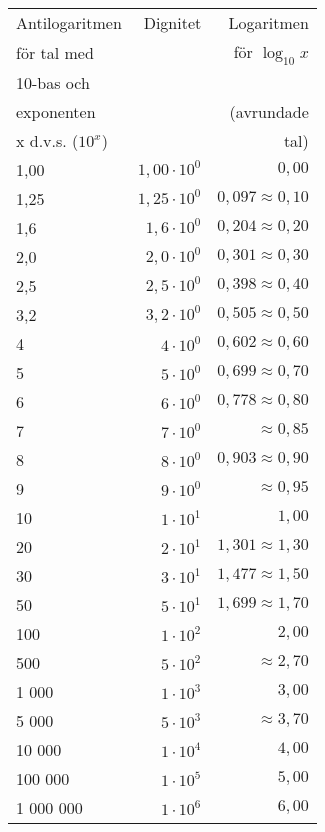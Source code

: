 \begin{center}
\begin{tabular}{l|r|r}
Antilogaritmen    & Dignitet & Logaritmen            \\
för tal med       &          & för \(\log_{10} x\)        \\
10-bas och        &          &                       \\
exponenten        &          & (avrundade            \\
x d.v.s. (\(10^x\)) &          & tal)                  \\ \hline
1,00      & \(1,00 \cdot 10^0\) & \(0,00\)               \\
1,25      & \(1,25 \cdot 10^0\) & \(0,097 \approx 0,10\) \\
1,6       & \(1,6 \cdot 10^0\) & \(0,204 \approx 0,20\)  \\
2,0       & \(2,0 \cdot 10^0\) & \(0,301 \approx 0,30\)  \\
2,5       & \(2,5 \cdot 10^0\) & \(0,398 \approx 0,40\)  \\
3,2       & \(3,2 \cdot 10^0\) & \(0,505 \approx 0,50\)  \\
4         & \(4 \cdot 10^0\)   & \(0,602 \approx 0,60\)  \\
5         & \(5 \cdot 10^0\)   & \(0,699 \approx 0,70\)  \\
6         & \(6 \cdot 10^0\)   & \(0,778 \approx 0,80\)  \\
7         & \(7 \cdot 10^0\)   & \(\approx 0,85\)        \\
8         & \(8 \cdot 10^0\)   & \(0,903 \approx 0,90\)  \\
9         & \(9 \cdot 10^0\)   & \(\approx 0,95\)        \\
10        & \(1 \cdot 10^1\)   & \(1,00\)                \\
20        & \(2 \cdot 10^1\)   & \(1,301 \approx 1,30\)  \\
30        & \(3 \cdot 10^1\)   & \(1,477 \approx 1,50\)  \\
50        & \(5 \cdot 10^1\)   & \(1,699 \approx 1,70\)  \\
100       & \(1 \cdot 10^2\)   & \(2,00\)                \\
500       & \(5 \cdot 10^2\)   & \(\approx 2,70\)        \\
1 000     & \(1 \cdot 10^3\)   & \(3,00\)                \\
5 000     & \(5 \cdot 10^3\)   & \(\approx 3,70\)         \\
10 000    & \(1 \cdot 10^4\)   & \(4,00\)                \\
100 000   & \(1 \cdot 10^5\)   & \(5,00\)                \\
1 000 000 & \(1 \cdot 10^6\)   & \(6,00\)                \\
\end{tabular}
\end{center}

